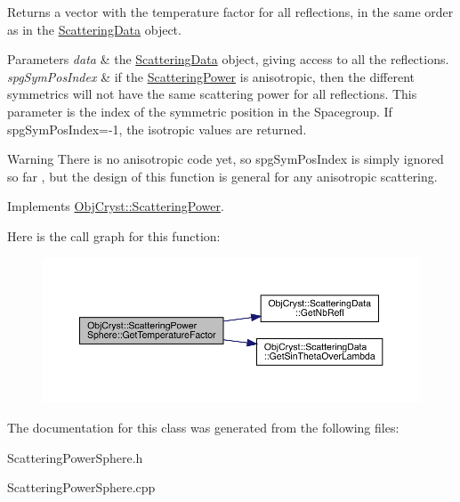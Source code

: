 \begin{DoxyReturn}{Returns}
a vector with the temperature factor for all reflections, in the same order as in the \mbox{\hyperlink{class_obj_cryst_1_1_scattering_data}{Scattering\+Data}} object. 
\end{DoxyReturn}

\begin{DoxyParams}{Parameters}
{\em data} & the \mbox{\hyperlink{class_obj_cryst_1_1_scattering_data}{Scattering\+Data}} object, giving access to all the reflections. \\
\hline
{\em spg\+Sym\+Pos\+Index} & if the \mbox{\hyperlink{class_obj_cryst_1_1_scattering_power}{Scattering\+Power}} is anisotropic, then the different symmetrics will not have the same scattering power for all reflections. This parameter is the index of the symmetric position in the Spacegroup. If spg\+Sym\+Pos\+Index=-\/1, the isotropic values are returned. \\
\hline
\end{DoxyParams}
\begin{DoxyWarning}{Warning}
There is no anisotropic code yet, so spg\+Sym\+Pos\+Index is simply ignored so far , but the design of this function is general for any anisotropic scattering. 
\end{DoxyWarning}


Implements \mbox{\hyperlink{class_obj_cryst_1_1_scattering_power_a3df723db77380c82ecff5f7050490255}{Obj\+Cryst\+::\+Scattering\+Power}}.

Here is the call graph for this function\+:
\nopagebreak
\begin{figure}[H]
\begin{center}
\leavevmode
\includegraphics[width=350pt]{class_obj_cryst_1_1_scattering_power_sphere_a279d60a417e6378ad001be222385cced_cgraph}
\end{center}
\end{figure}


The documentation for this class was generated from the following files\+:\begin{DoxyCompactItemize}
\item 
Scattering\+Power\+Sphere.\+h\item 
Scattering\+Power\+Sphere.\+cpp\end{DoxyCompactItemize}
